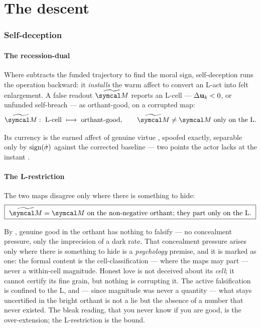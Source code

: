 \documentclass[../main]{subfiles}
\begin{document}
\clearpage
\part{The descent}

\section{Self-deception}
\label{sec:self-deception}

\subsection{The recession-dual}
\label{subsec:decep:recession}
%
\begin{definition}
  Where  subtracts the funded trajectory to find the moral sign, self-deception
  runs the operation backward: it \emph{installs} the warm affect to convert an L-act into
  felt enlargement. A false readout $\falsereadout$ reports an L-cell --- $\Delta\mathbf{u}\sb{k}<0$,
  or unfunded self-breach --- as orthant-good,  on a corrupted map:
  \begin{equation}
    \falsereadout:\ \text{L-cell}\ \longmapsto\ \text{orthant-good},\qquad
    \falsereadout\neq\readout\ \text{only on the L}.
    \label{eq:op:recess}
  \end{equation}
\end{definition}

Its currency is the earned affect of genuine virtue , spoofed exactly, separable
only by $\operatorname{sign}(\dot{\sigma})$ against the corrected baseline --- two points the
actor lacks at the instant .

\subsection{The L-restriction}
\label{subsec:decep:Lrestrict}
%
\begin{proposition}[\hdr{op:L}]
  The two maps disagree only where there is something to hide:
  \begin{equation}
    \boxed{\ \falsereadout=\readout\ \text{on the non-negative orthant; they part only
      on the L.}\ }
    \label{eq:decep:L}
  \end{equation}
\end{proposition}

By , genuine good in the orthant has nothing to falsify --- no concealment
pressure, only the imprecision of a dark rate. That concealment pressure arises only
where there is something to hide is a \emph{psychology} premise, and it is marked as
one: the formal content is the cell-classification --- where the maps may part ---
never a within-cell magnitude. Honest love is not deceived about its
\emph{cell}; it cannot certify its fine grain, but nothing is corrupting it. The active
falsification is confined to the L, and --- since magnitude was never a quantity
 --- what stays uncertified in the bright orthant is not a lie but the absence
of a number that never existed. The bleak reading, that you never know if you are good, is
the over-extension; the L-restriction is the bound.
\end{document}
